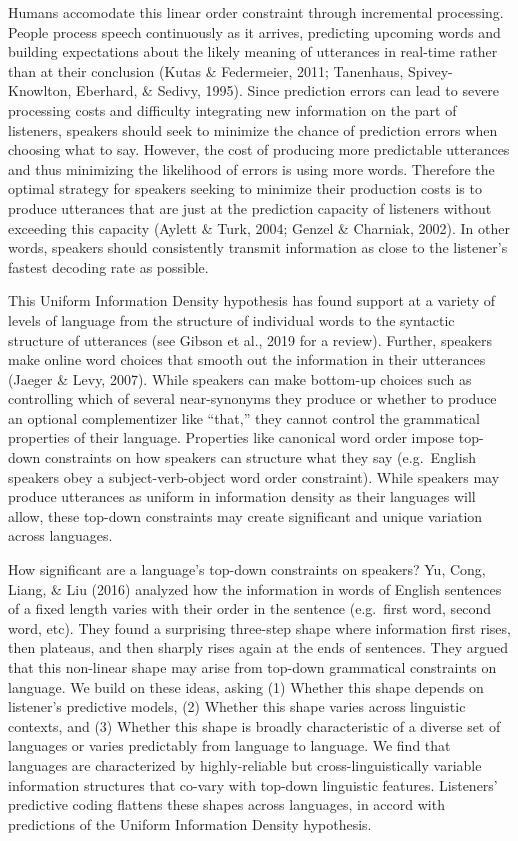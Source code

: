 \documentclass[10pt, letterpaper]{article}
\begin{document}
Humans accomodate this linear order constraint through incremental
processing. People process speech continuously as it arrives, predicting
upcoming words and building expectations about the likely meaning of
utterances in real-time rather than at their conclusion (Kutas \&
Federmeier, 2011; Tanenhaus, Spivey-Knowlton, Eberhard, \& Sedivy,
1995). Since prediction errors can lead to severe processing costs and
difficulty integrating new information on the part of listeners,
speakers should seek to minimize the chance of prediction errors when
choosing what to say. However, the cost of producing more predictable
utterances and thus minimizing the likelihood of errors is using more
words. Therefore the optimal strategy for speakers seeking to minimize
their production costs is to produce utterances that are just at the
prediction capacity of listeners without exceeding this capacity (Aylett
\& Turk, 2004; Genzel \& Charniak, 2002). In other words, speakers
should consistently transmit information as close to the listener's
fastest decoding rate as possible.

This Uniform Information Density hypothesis has found support at a
variety of levels of language from the structure of individual words to
the syntactic structure of utterances (see Gibson et al., 2019 for a
review). Further, speakers make online word choices that smooth out the
information in their utterances (Jaeger \& Levy, 2007). While speakers
can make bottom-up choices such as controlling which of several
near-synonyms they produce or whether to produce an optional
complementizer like ``that,'' they cannot control the grammatical
properties of their language. Properties like canonical word order
impose top-down constraints on how speakers can structure what they say
(e.g.~English speakers obey a subject-verb-object word order
constraint). While speakers may produce utterances as uniform in
information density as their languages will allow, these top-down
constraints may create significant and unique variation across
languages.

How significant are a language's top-down constraints on speakers? Yu,
Cong, Liang, \& Liu (2016) analyzed how the information in words of
English sentences of a fixed length varies with their order in the
sentence (e.g.~first word, second word, etc). They found a surprising
three-step shape where information first rises, then plateaus, and then
sharply rises again at the ends of sentences. They argued that this
non-linear shape may arise from top-down grammatical constraints on
language. We build on these ideas, asking (1) Whether this shape depends
on listener's predictive models, (2) Whether this shape varies across
linguistic contexts, and (3) Whether this shape is broadly
characteristic of a diverse set of languages or varies predictably from
language to language. We find that languages are characterized by
highly-reliable but cross-linguistically variable information structures
that co-vary with top-down linguistic features. Listeners' predictive
coding flattens these shapes across languages, in accord with
predictions of the Uniform Information Density hypothesis.
\end{document}
